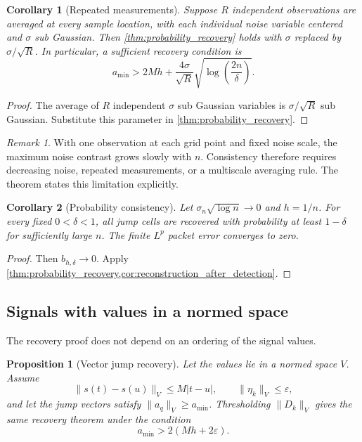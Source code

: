 \documentclass{aomart}
\newtheorem{proposition}[proposition]{Proposition}
\newtheorem{corollary}[corollary]{Corollary}
\theoremstyle{definition}
\theoremstyle{remark}
\newtheorem{remark}[remark]{Remark}
\begin{document}
\begin{corollary}[Repeated measurements]\label{cor:repeated_measurements}
Suppose \(R\) independent observations are averaged at every sample location, with each individual noise variable centered and \(\sigma\) sub Gaussian. Then \cref{thm:probability_recovery} holds with \(\sigma\) replaced by \(\sigma/\sqrt R\). In particular, a sufficient recovery condition is
\[
a_{\min}
>
2Mh+
\frac{4\sigma}{\sqrt R}
\sqrt{\log\left(\frac{2n}{\delta}\right)}.
\]
\end{corollary}

\begin{proof}
The average of \(R\) independent \(\sigma\) sub Gaussian variables is \(\sigma/\sqrt R\) sub Gaussian. Substitute this parameter in \cref{thm:probability_recovery}.
\end{proof}

\begin{remark}\label{rem:noise_scaling}
With one observation at each grid point and fixed noise scale, the maximum noise contrast grows slowly with \(n\). Consistency therefore requires decreasing noise, repeated measurements, or a multiscale averaging rule. The theorem states this limitation explicitly.
\end{remark}

\begin{corollary}[Probability consistency]\label{cor:probability_consistency}
Let \(\sigma_n\sqrt{\log n}\to0\) and \(h=1/n\). For every fixed \(0<\delta<1\), all jump cells are recovered with probability at least \(1-\delta\) for sufficiently large \(n\). The finite \(L^p\) packet error converges to zero.
\end{corollary}

\begin{proof}
Then \(b_{h,\delta}\to0\). Apply \cref{thm:probability_recovery,cor:reconstruction_after_detection}.
\end{proof}

\subsection{Signals with values in a normed space}

The recovery proof does not depend on an ordering of the signal values.

\begin{proposition}[Vector jump recovery]\label{prop:vector_jump_recovery}
Let the values lie in a normed space \(V\). Assume
\[
\|s(t)-s(u)\|_V\leq M|t-u|,
\qquad
\|\eta_k\|_V\leq\varepsilon,
\]
and let the jump vectors satisfy \(\|a_q\|_V\geq a_{\min}\). Thresholding \(\|D_k\|_V\) gives the same recovery theorem under the condition
\[
a_{\min}>2(Mh+2\varepsilon).
\]
\end{proposition}
\end{document}
